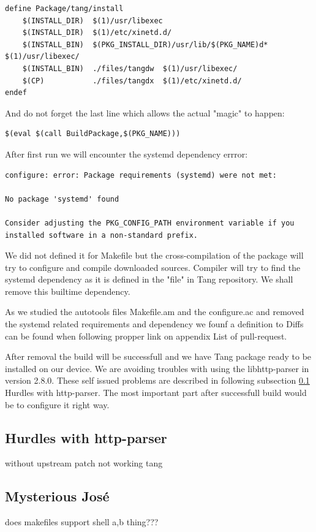 \begin{lstlisting}[columns=fixed,basicstyle=\ttfamily\footnotesize,tabsize=4,backgroundcolor=\color{yellow!10}]
define Package/tang/install
	$(INSTALL_DIR)	$(1)/usr/libexec
	$(INSTALL_DIR)	$(1)/etc/xinetd.d/
	$(INSTALL_BIN)	$(PKG_INSTALL_DIR)/usr/lib/$(PKG_NAME)d*	$(1)/usr/libexec/
	$(INSTALL_BIN)	./files/tangdw	$(1)/usr/libexec/
	$(CP)			./files/tangdx	$(1)/etc/xinetd.d/
endef
\end{lstlisting}
And do not forget the last line which allows the actual "magic" to happen:
\begin{lstlisting}[columns=fixed,basicstyle=\ttfamily\footnotesize,tabsize=4,backgroundcolor=\color{yellow!10}]
$(eval $(call BuildPackage,$(PKG_NAME)))
\end{lstlisting}

After first run we will encounter the systemd dependency errror:
\begin{lstlisting}[columns=fixed,basicstyle=\ttfamily\footnotesize,tabsize=4,backgroundcolor=\color{yellow!10}]
configure: error: Package requirements (systemd) were not met:

No package 'systemd' found

Consider adjusting the PKG_CONFIG_PATH environment variable if you
installed software in a non-standard prefix.
\end{lstlisting}
We did not defined it for Makefile but the cross-compilation of the package will try to configure and compile downloaded sources.
Compiler will try to find the systemd dependency as it is defined in the "file" in Tang repository.
We shall remove this builtime dependency.

As we studied the autotools files Makefile.am and the configure.ac and removed the systemd related requirements and dependency we founf a definition to
Diffs can be found when following propper link on appendix \label{diffs} List of pull-request.


After removal the build will be successfull and we have Tang package ready to be installed on our device.
We are avoiding troubles with using the libhttp-parser in version 2.8.0.
These self issued problems are described in following subsection \ref{http_parser_problems} Hurdles with http-parser.
The most important part after successfull build would be to configure it right way.



\subsection{Hurdles with http-parser}\label{http_parser_problems}

without upstream patch not working tang 
\newpage



\subsection{Mysterious José}

does makefiles support shell {a,b} thing???
\newpage
